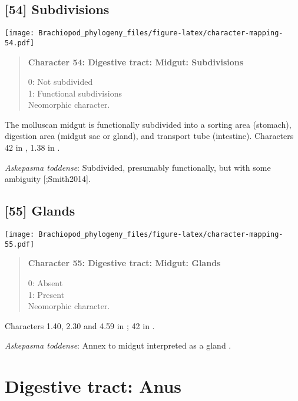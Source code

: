 \documentclass[openany]{book}
\theoremstyle{definition}
\theoremstyle{definition}
\theoremstyle{definition}
\theoremstyle{remark}
\begin{document}
\subsection*{{[}54{]} Subdivisions}\label{subdivisions}

\texttt{[image: Brachiopod\_phylogeny\_files/figure-latex/character-mapping-54.pdf]}

\begin{quote}
\textbf{Character 54: Digestive tract: Midgut: Subdivisions}

0: Not subdivided\\
1: Functional subdivisions\\
Neomorphic character.
\end{quote}

The molluscan midgut is functionally subdivided into a sorting area
(stomach), digestion area (midgut sac or gland), and transport tube
(intestine). Characters 42 in \citet{Haszprunar2000}, 1.38 in
\citet{SPS1996}.

\hypertarget{Askepasma_toddense-coding-54}{}
\emph{Askepasma toddense}: Subdivided, presumably functionally, but with
some ambiguity {[}\citet{Smith2012M};Smith2014{]}.

\subsection*{{[}55{]} Glands}\label{glands}

\texttt{[image: Brachiopod\_phylogeny\_files/figure-latex/character-mapping-55.pdf]}

\begin{quote}
\textbf{Character 55: Digestive tract: Midgut: Glands}

0: Absent\\
1: Present\\
Neomorphic character.
\end{quote}

Characters 1.40, 2.30 and 4.59 in \citet{SPS1996}; 42 in
\citet{Haszprunar2000}.

\hypertarget{Askepasma_toddense-coding-55}{}
\emph{Askepasma toddense}: Annex to midgut interpreted as a gland
\citep{Smith2012M}.

\section{Digestive tract: Anus}\label{digestive-tract-anus}
\end{document}
